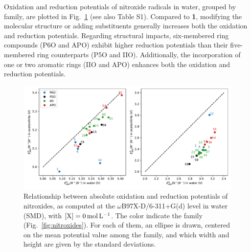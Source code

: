 \documentclass[review]{elsarticle}
\begin{document}
Oxidation and reduction potentials of nitroxide radicals in water, grouped by family, are plotted in Fig.~\ref{fig:family} (see also Table S1). Compared to \textbf{1}, modifying the molecular structure or adding substituents generally increases both the oxidation and reduction potentials. Regarding structural impacts, six-membered ring compounds (P6O and APO) exhibit higher reduction potentials than their five-membered ring counterparts (P5O and IIO). Additionally, the incorporation of one or two aromatic rings (IIO and APO) enhances both the oxidation and reduction potentials.


\begin{figure}[!h]
	\centering
	\includegraphics[width=.9\linewidth]{Figure7}
	\caption{Relationship between absolute oxidation and reduction potentials of nitroxides, as computed at the $\omega$B97X-D/6-311+G(d) level in water (SMD), with $[\ce{X}]=\SI{0}{\mole\per\liter}$. The color indicate the family (Fig.~\ref{fig:nitroxides}). For each of them, an ellipse is drawn, centered on the mean potential value among the family, and which width and height are given by the standard deviations.}
	\label{fig:family}
\end{figure}
\end{document}
